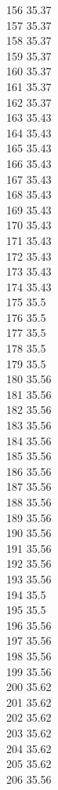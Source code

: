 156	35.37\\
157	35.37\\
158	35.37\\
159	35.37\\
160	35.37\\
161	35.37\\
162	35.37\\
163	35.43\\
164	35.43\\
165	35.43\\
166	35.43\\
167	35.43\\
168	35.43\\
169	35.43\\
170	35.43\\
171	35.43\\
172	35.43\\
173	35.43\\
174	35.43\\
175	35.5\\
176	35.5\\
177	35.5\\
178	35.5\\
179	35.5\\
180	35.56\\
181	35.56\\
182	35.56\\
183	35.56\\
184	35.56\\
185	35.56\\
186	35.56\\
187	35.56\\
188	35.56\\
189	35.56\\
190	35.56\\
191	35.56\\
192	35.56\\
193	35.56\\
194	35.5\\
195	35.5\\
196	35.56\\
197	35.56\\
198	35.56\\
199	35.56\\
200	35.62\\
201	35.62\\
202	35.62\\
203	35.62\\
204	35.62\\
205	35.62\\
206	35.56\\

